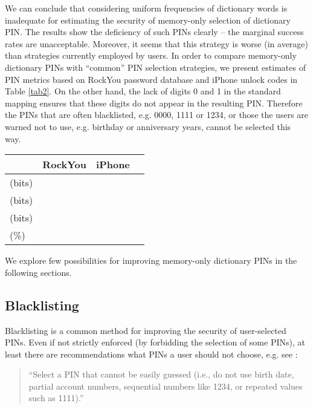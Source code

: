 \documentclass[a4paper, 11pt]{article}
\newcommand{\ra}[1]{\renewcommand{\arraystretch}{#1}}
\begin{document}
{We can conclude that considering uniform frequencies of dictionary words is inadequate for estimating the security of memory-only
selection of dictionary PIN. The results show the deficiency of such PINs clearly -- the marginal success
rates are unacceptable. Moreover, it seems that this strategy is worse (in average) than strategies currently employed by
users. In order to compare memory-only dictionary PINs with ``common'' PIN selection strategies, we present estimates 
of PIN metrics based on RockYou password database and iPhone unlock codes \cite{BPA12} in Table \ref{tab2}.
On the other hand, the lack of digits 0 and 1 in the standard mapping ensures that these digits do not appear in the 
resulting PIN. Therefore the PINs that are often blacklisted, e.g. 0000, 1111 or 1234, or those the users are warned not to 
use, e.g. birthday or anniversary years, cannot be selected this way.

\begin{table*}[h]\centering
\ra{1.2}
\begin{tabular}{@{}lrrr@{}}\toprule
 & RockYou & iPhone \\
 \midrule
 (bits)       &  &  \\
  (bits) &  &  \\
 (bits) &  &  \\
 (\%) &  &  \\
\bottomrule
\end{tabular}
\caption{Estimation of PIN metrics (PIN length 4) \cite{BPA12}}\label{tab2}
\end{table*}

We explore few possibilities for improving memory-only dictionary PINs in the following sections.


\subsection{Blacklisting}

Blacklisting is a common method for improving the security of user-selected PINs. Even if not strictly enforced
(by forbidding the selection of some PINs), at least there are recommendations what PINs a user should not
choose, e.g. see \cite{VISA}:

\begin{quote}
``Select a PIN that cannot be easily guessed (i.e., do not use birth date, 
partial account numbers, sequential numbers like 1234, or repeated 
values such as 1111).''
\end{quote}

}
\end{document}
